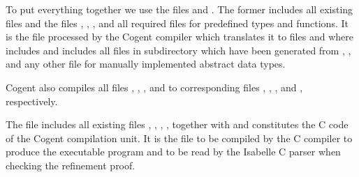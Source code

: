 To put everything together we use the files  and . The former includes all 
existing  files and the files , , 
, and all required files  for predefined types and functions.
It is the file processed by the Cogent compiler which translates it to files  
and  where  includes  and  includes all files
in subdirectory  which have been generated from , , and any
other file  for manually implemented abstract data types. 

Cogent also compiles all files , , , and  to corresponding 
files , , , and , respectively.

The file  includes all existing files 
, , , , 
together with  and constitutes the C code of the Cogent compilation unit. It is the file to be compiled 
by the C compiler to produce the executable program and to be read by the Isabelle C parser when checking the refinement proof.


